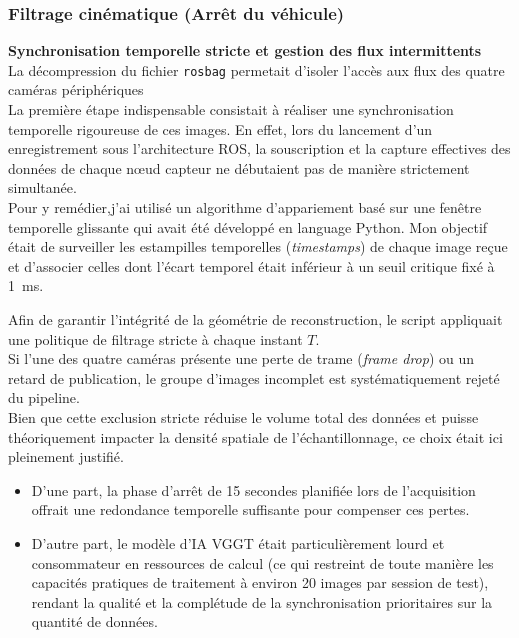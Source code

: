 \documentclass[12pt,a4paper,oneside]{report}
\begin{document}
\subsubsection{Filtrage cinématique (Arrêt du véhicule)}

\hspace*{0.4cm}\textbf{Synchronisation temporelle stricte et gestion des flux intermittents}\\

La décompression du fichier \texttt{rosbag} permetait d'isoler l'accès aux flux des quatre caméras périphériques\\
\hspace*{.3cm}La première étape indispensable consistait à réaliser une synchronisation temporelle rigoureuse de ces images. En effet, lors du lancement d'un enregistrement sous l'architecture ROS, la souscription et la capture effectives des données de chaque nœud capteur ne débutaient pas de manière strictement simultanée. \\

\hspace*{.3cm}Pour y remédier,j'ai utilisé un algorithme d'appariement basé sur une fenêtre temporelle glissante qui avait été développé en language Python. Mon objectif était de surveiller les estampilles temporelles (\textit{timestamps}) de chaque image reçue et d'associer celles dont l'écart temporel était inférieur à un seuil critique fixé à 1~ms. 

\hspace*{.3cm}Afin de garantir l'intégrité de la géométrie de reconstruction, le script appliquait une politique de filtrage stricte à chaque instant $T$.\\
\hspace*{0.3cm} Si l'une des quatre caméras présente une perte de trame (\textit{frame drop}) ou un retard de publication, le groupe d'images incomplet est systématiquement rejeté du pipeline.\\
\hspace*{.3cm} Bien que cette exclusion stricte réduise le volume total des données et puisse théoriquement impacter la densité spatiale de l'échantillonnage, ce choix était ici pleinement justifié.
\begin{itemize}[itemsep=0.5em]
	\item D'une part, la phase d'arrêt de 15 secondes planifiée lors de l'acquisition offrait une redondance temporelle suffisante pour compenser ces pertes.
	\item D'autre part, le modèle d'IA VGGT était particulièrement lourd et consommateur en ressources de calcul (ce qui restreint de toute manière les capacités pratiques de traitement à environ 20 images par session de test), rendant la qualité et la complétude de la synchronisation prioritaires sur la quantité de données.
\end{itemize}
\end{document}
